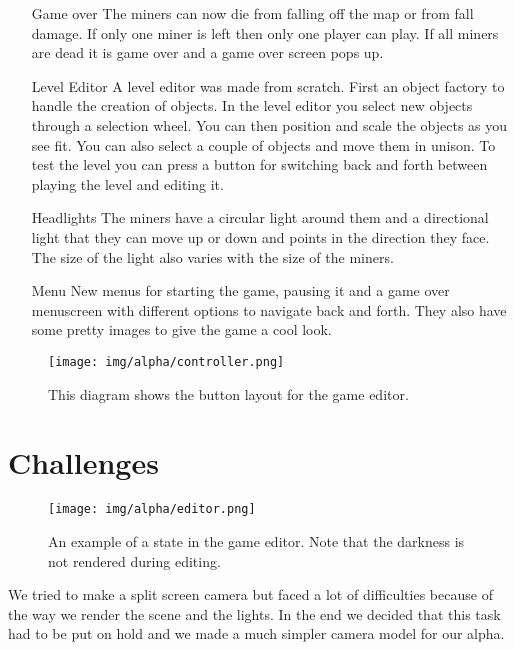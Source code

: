 \begin{itemize}
    \item[Game over]
    The miners can now die from falling off the map or from fall damage. If only one miner is left then only one player can play. If all miners are dead it is game over and a game over screen pops up.
    
    \item[Level Editor]
    A level editor was made from scratch. First an object factory to handle the creation of objects. In the level editor you select new objects through a selection wheel. You can then position and scale the objects as you see fit. You can also select a couple of objects and move them in unison. To test the level you can press a button for switching back and forth between playing the level and editing it.
    
    \item[Headlights]
    The miners have a circular light around them and a directional light that they can move up or down and points in the direction they face. The size of the light also varies with the size of the miners.
    
    \item[Menu]
    New menus for starting the game, pausing it and a game over menuscreen with different options to navigate back and forth. They also have some pretty images to give the game a cool look.
\end{itemize}

\begin{figure}
\centering
\texttt{[image: img/alpha/controller.png]}
\caption{This diagram shows the button layout for the game editor.}
\end{figure}

\newpage

\section{Challenges}

\begin{figure}[ht]
\centering
\texttt{[image: img/alpha/editor.png]}
\caption{An example of a state in the game editor. Note that the darkness is not rendered during editing.}
\end{figure}
We tried to make a split screen camera but faced a lot of difficulties because of the way we render the scene and the lights. In the end we decided that this task had to be put on hold and we made a much simpler camera model for our alpha. 


